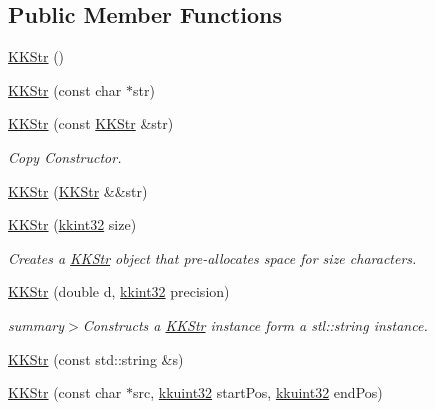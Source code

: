 \subsection*{Public Member Functions}
\begin{DoxyCompactItemize}
\item 
\hyperlink{class_k_k_b_1_1_k_k_str_ac64d7c951a99be7851a55184cdd8f5ba}{K\+K\+Str} ()
\item 
\hyperlink{class_k_k_b_1_1_k_k_str_a2aa610da9552e309a11aba4ff6abd909}{K\+K\+Str} (const char $\ast$str)
\item 
\hyperlink{class_k_k_b_1_1_k_k_str_abf22972d2c627080eb966c6e55d447bb}{K\+K\+Str} (const \hyperlink{class_k_k_b_1_1_k_k_str}{K\+K\+Str} \&str)
\begin{DoxyCompactList}\small\item\em Copy Constructor. \end{DoxyCompactList}\item 
\hyperlink{class_k_k_b_1_1_k_k_str_a49e3d2e47a924af893228e5b0a209c52}{K\+K\+Str} (\hyperlink{class_k_k_b_1_1_k_k_str}{K\+K\+Str} \&\&str)
\item 
\hyperlink{class_k_k_b_1_1_k_k_str_ab168fbf3729e8bc1f534ed1ca1691ce2}{K\+K\+Str} (\hyperlink{namespace_k_k_b_a8fa4952cc84fda1de4bec1fbdd8d5b1b}{kkint32} size)
\begin{DoxyCompactList}\small\item\em Creates a \hyperlink{class_k_k_b_1_1_k_k_str}{K\+K\+Str} object that pre-\/allocates space for \textquotesingle{}size\textquotesingle{} characters. \end{DoxyCompactList}\item 
\hyperlink{class_k_k_b_1_1_k_k_str_a25fb62981ba717904862963ea736ca48}{K\+K\+Str} (double d, \hyperlink{namespace_k_k_b_a8fa4952cc84fda1de4bec1fbdd8d5b1b}{kkint32} precision)
\begin{DoxyCompactList}\small\item\em summary$>$Constructs a \hyperlink{class_k_k_b_1_1_k_k_str}{K\+K\+Str} instance form a stl\+::string instance.\end{DoxyCompactList}\item 
\hyperlink{class_k_k_b_1_1_k_k_str_a737ed9e46b4819211b6083326c5e9f30}{K\+K\+Str} (const std\+::string \&s)
\item 
\hyperlink{class_k_k_b_1_1_k_k_str_a77645bf046a5a662a2bf38d71cc8d4b8}{K\+K\+Str} (const char $\ast$src, \hyperlink{namespace_k_k_b_af8d832f05c54994a1cce25bd5743e19a}{kkuint32} start\+Pos, \hyperlink{namespace_k_k_b_af8d832f05c54994a1cce25bd5743e19a}{kkuint32} end\+Pos)

\end{DoxyCompactItemize}
